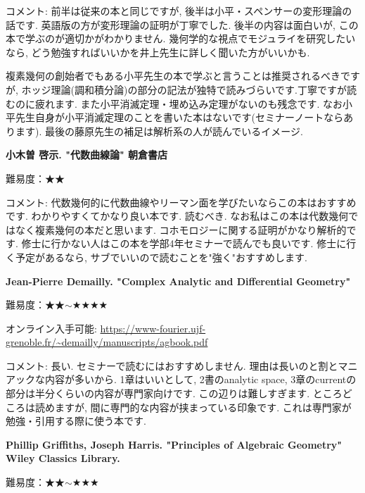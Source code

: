 コメント:  前半は従来の本と同じですが, 後半は小平・スペンサーの変形理論の話です. 英語版の方が変形理論の証明が丁寧でした. 後半の内容は面白いが, この本で学ぶのが適切かがわかりません. 幾何学的な視点でモジュライを研究したいなら, どう勉強すればいいかを井上先生に詳しく聞いた方がいいかも. 

複素幾何の創始者でもある小平先生の本で学ぶと言うことは推奨されるべきですが, ホッジ理論(調和積分論)の部分の記法が独特で読みづらいです.丁寧ですが読むのに疲れます. また小平消滅定理・埋め込み定理がないのも残念です.  なお小平先生自身が小平消滅定理のことを書いた本はないです(セミナーノートならあります). 最後の藤原先生の補足は解析系の人が読んでいるイメージ. 
\vspace{8pt}

\textbf{小木曽 啓示. "代数曲線論" 朝倉書店}\vspace{-6pt}

難易度：★★ \vspace{-6pt} 

コメント: 代数幾何的に代数曲線やリーマン面を学びたいならこの本はおすすめです. わかりやすくてかなり良い本です. 読むべき. 
なお私はこの本は代数幾何ではなく複素幾何の本だと思います. コホモロジーに関する証明がかなり解析的です. 修士に行かない人はこの本を学部4年セミナーで読んでも良いです. 修士に行く予定があるなら, サブでいいので読むことを"強く"おすすめします. 
\vspace{8pt}

\textbf{Jean-Pierre Demailly. "Complex Analytic and Differential Geometry"} \vspace{-6pt}

難易度：★★$\sim$★★★★  \vspace{-6pt}

オンライン入手可能: \url{https://www-fourier.ujf-grenoble.fr/~demailly/manuscripts/agbook.pdf}\vspace{-6pt}

コメント: 長い. セミナーで読むにはおすすめしません. 理由は長いのと割とマニアックな内容が多いから. 1章はいいとして, 2書のanalytic space, 3章のcurrentの部分は半分くらいの内容が専門家向けです. この辺りは難しすぎます. ところどころは読めますが, 間に専門的な内容が挟まっている印象です. これは専門家が勉強・引用する際に使う本です. 
\vspace{8pt}

\textbf{Phillip Griffiths, Joseph Harris. "Principles of Algebraic Geometry" Wiley Classics Library.}  \vspace{-6pt}

難易度：★★$\sim$★★★ \vspace{-6pt} 

